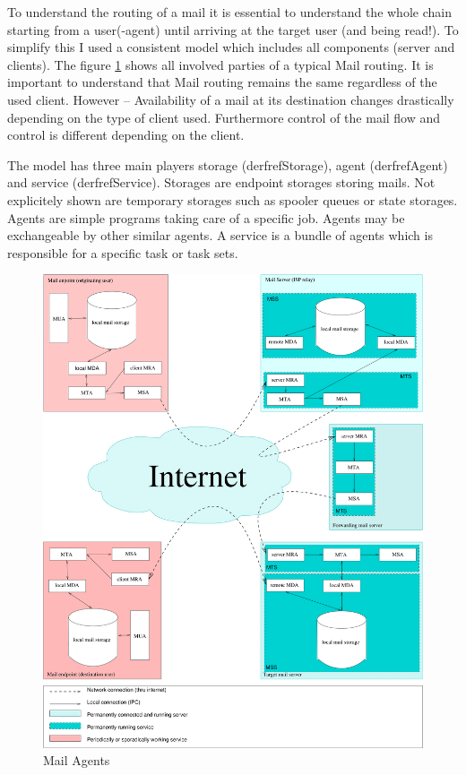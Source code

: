 To understand the routing of a mail it is essential to understand the whole chain starting from a user(-agent) until arriving at the target user (and being read!). To simplify this I used a consistent model which includes all components (server and clients). The figure \ref{fig:MailAgents} shows all involved parties of a typical Mail routing. It is important to understand that Mail routing remains the same regardless of the used client. However -- Availability of a mail at its destination changes drastically depending on the type of client used. Furthermore control of the mail flow and control is different depending on the client.\par

The model has three main players storage (derfref{Storage}), agent (derfref{Agent}) and service (derfref{Service}). Storages are endpoint storages storing mails. Not explicitely shown are temporary storages such as spooler queues or state storages. Agents are simple programs taking care of a specific job. Agents may be exchangeable by other similar agents. A service is a bundle of agents which is responsible for a specific task or task sets.

\begin{figure}[ht!]
	\centering\includegraphics[width=\columnwidth]{inc/MailAgents1.pdf}
	\caption{Mail Agents}\label{fig:MailAgents}
\end{figure}

